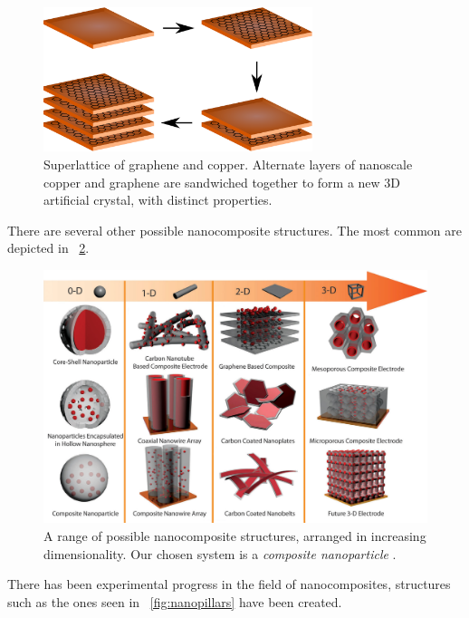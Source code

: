 \documentclass[12pt]{article}
\newcommand{\figref}[2][\figurename~]{#1\ref{#2}}
\begin{document}
\begin{figure}
	\centering
	\includegraphics[width=0.7\textwidth]{graphene-superlattice.eps}
	\caption{Superlattice of graphene and copper. Alternate layers of nanoscale copper and graphene are sandwiched together to form a new 3D artificial crystal, with distinct properties.}
	\label{fig:superlattice}
\end{figure}

There are several other possible nanocomposite structures. The most common are depicted in \figref{fig:nanocomposite-structures}.

\begin{figure}
	\centering
	\includegraphics[width=\textwidth]{nanocomposite-structures.png}
	\caption{A range of possible nanocomposite structures, arranged in increasing dimensionality. Our chosen system is a \emph{composite nanoparticle} \cite{nanowires}.}
	\label{fig:nanocomposite-structures}
\end{figure}

There has been experimental progress in the field of nanocomposites, structures such as the ones seen in \figref{fig:nanopillars} have been created.
\end{document}
